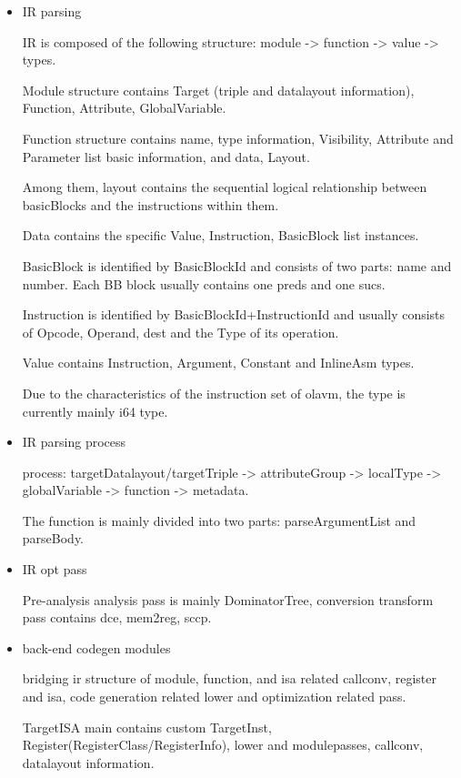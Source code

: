     \begin{itemize}
        \item IR parsing

    IR is composed of the following structure: module -> function -> value -> types.

    Module structure contains Target (triple and datalayout information), Function, Attribute, GlobalVariable.

    Function structure contains name, type information, Visibility, Attribute and Parameter list basic information, and data, Layout.

    Among them, layout contains the sequential logical relationship between basicBlocks and the instructions within them.

    Data contains the specific Value, Instruction, BasicBlock list instances.

    BasicBlock is identified by BasicBlockId and consists of two parts: name and number. Each BB block usually contains one preds and one sucs.

    Instruction is identified by BasicBlockId+InstructionId and usually consists of Opcode, Operand, dest and the Type of its operation.

    Value contains Instruction, Argument, Constant and InlineAsm types.

    Due to the characteristics of the instruction set of olavm, the type is currently mainly i64 type.

        \item IR parsing process

        process: targetDatalayout/targetTriple -> attributeGroup -> localType -> globalVariable -> function -> metadata.

    The function is mainly divided into two parts: parseArgumentList and parseBody.

        \item IR opt pass

    Pre-analysis analysis pass is mainly DominatorTree, conversion transform pass contains dce, mem2reg, sccp.

        \item back-end codegen modules

    bridging ir structure of module, function, and isa related callconv, register and isa, code generation related lower and optimization related pass.

    TargetISA main contains custom TargetInst, Register(RegisterClass/RegisterInfo), lower and modulepasses, callconv, datalayout information.


\end{itemize}
